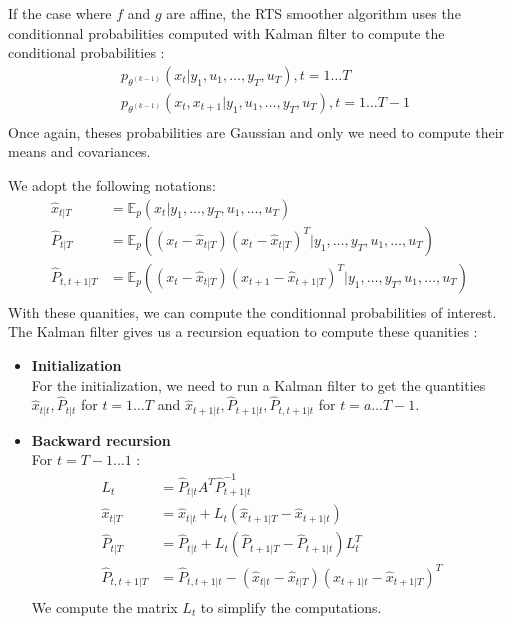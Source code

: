 If the case where $f$ and $g$ are affine, the RTS smoother algorithm uses the conditionnal probabilities computed with Kalman filter to compute the conditional probabilities :
\begin{align*}
  &p_{\theta^{(k-1)}}\left(x_t|y_1, u_1, \ldots, y_T, u_T \right ), t=1 \ldots T\\
  &p_{\theta^{(k-1)}}\left(x_t, x_{t+1}|y_1, u_1, \ldots, y_T, u_T \right ), t=1 \ldots T-1\\
\end{align*}
Once again, theses probabilities are Gaussian and only we need to compute their means and covariances.

We adopt the following notations:
\begin{align*}
  \hat{x}_{t|T} &= \mathbb{E}_p(x_t|y_1, \ldots , y_T, u_1, \ldots , u_T) \\
  \hat{P}_{t|T} &= \mathbb{E}_p \left ((x_t - \hat{x}_{t|T})(x_t - \hat{x}_{t|T})^T|y_1, \ldots , y_T, u_1, \ldots , u_T \right ) \\
  \hat{P}_{t,t+1|T} &= \mathbb{E}_p \left ((x_t - \hat{x}_{t|T})(x_{t+1} - \hat{x}_{t+1|T})^T|y_1, \ldots , y_T, u_1, \ldots , u_T \right ) \\
\end{align*}
With these quanities, we can compute the conditionnal probabilities of interest.
The Kalman filter gives us a recursion equation to compute these quanities :
\begin{itemize}
  \item \textbf{Initialization}\\
    For the initialization, we need to run a Kalman filter to get the quantities $\hat{x}_{t|t}, \hat{P}_{t|t}$ for $t=1 \ldots T$ and $\hat{x}_{t+1|t}, \hat{P}_{t+1|t}, \hat{P}_{t,t+1|t}$ for $t=a \ldots T-1$.
  \item \textbf{Backward recursion}\\
    For $t=T-1 \ldots 1$ :
    \begin{align*}
      L_t &= \hat{P}_{t|t}A^T\hat{P}_{t+1|t}^{-1}\\
      \hat{x}_{t|T} &= \hat{x}_{t|t} + L_t(\hat{x}_{t+1|T} - \hat{x}_{t+1|t})\\
      \hat{P}_{t|T} &= \hat{P}_{t|t} + L_t(\hat{P}_{t+1|T} - \hat{P}_{t+1|t})L_t^T\\
      \hat{P}_{t,t+1|T} &= \hat{P}_{t,t+1|t} - (\hat{x}_{t|t} - \hat{x}_{t|T})(\hat{x}_{t+1|t} - \hat{x}_{t+1|T})^T\\
    \end{align*}
    We compute the matrix $L_{t}$ to simplify the computations.
\end{itemize}

